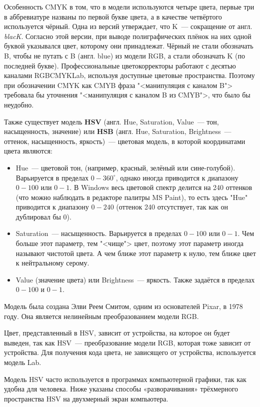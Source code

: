 Особенность CMYK в том, что в модели используются четыре цвета, первые три в аббревиатуре названы по первой букве цвета, а в качестве четвёртого используется чёрный. Одна из версий утверждает, что K~--- сокращение от англ. \textit{blacK}. Согласно этой версии, при выводе полиграфических плёнок на них одной буквой указывался цвет, которому они принадлежат. Чёрный не стали обозначать B, чтобы не путать с B (англ. blue) из модели RGB, а стали обозначать K (по последней букве). Профессиональные цветокорректоры работают с десятью каналами RGBCMYKLab, используя доступные цветовые пространства. Поэтому при обозначении CMYK как CMYB фраза "<манипуляция с каналом B"> требовала бы уточнения "<манипуляция с каналом B из CMYB">, что было бы неудобно.

Также существует модель \textbf{HSV} (англ. Hue, Saturation, Value~--- тон, насыщенность, значение) или \textbf{HSB} (англ. Hue, Saturation, Brightness~--- оттенок, насыщенность, яркость)~--- цветовая модель, в которой координатами цвета являются:
\begin{itemize}
	\item Hue~--- цветовой тон, (например, красный, зелёный или сине-голубой). Варьируется в пределах $0{-}360^{\circ}$, однако иногда приводится к диапазону $0{-}100$ или $0{-}1$. В Windows весь цветовой спектр делится на 240 оттенков (что можно наблюдать в редакторе палитры MS Paint), то есть здесь "Hue" приводится к диапазону $0{-}240$ (оттенок 240 отсутствует, так как он дублировал бы 0).
	\item Saturation~--- насыщенность. Варьируется в пределах $0{-}100$ или $0{-}1$. Чем больше этот параметр, тем "<чище"> цвет, поэтому этот параметр иногда называют чистотой цвета. А чем ближе этот параметр к нулю, тем ближе цвет к нейтральному серому.
	\item Value (значение цвета) или Brightness~--- яркость. Также задаётся в пределах $0{-}100$ и $0{-}1$.
\end{itemize}

Модель была создана Элви Реем Смитом, одним из основателей Pixar, в 1978 году. Она является нелинейным преобразованием модели RGB.

Цвет, представленный в HSV, зависит от устройства, на которое он будет выведен, так как HSV~--- преобразование модели RGB, которая тоже зависит от устройства. Для получения кода цвета, не зависящего от устройства, используется модель Lab.

Модель HSV часто используется в программах компьютерной графики, так как удобна для человека. Ниже указаны способы «разворачивания» трёхмерного пространства HSV на двухмерный экран компьютера.

